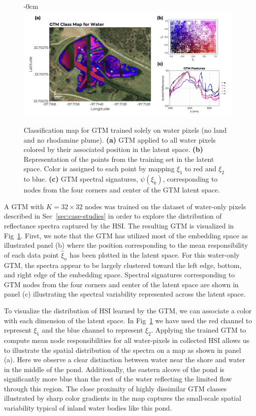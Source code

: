 \documentclass[remotesensing,article,submit,pdftex,moreauthors]{Definitions/mdpi}
\begin{document}
\begin{figure}[t]
\begin{adjustwidth}{-\extralength}{0cm}
\centering
\includegraphics[width=18.0cm]{paper/figures/results/gtm-water.png}
\end{adjustwidth}
\caption{Classification map for GTM trained solely on water pixels (no land and no rhodamine plume). \textbf{(a)} GTM applied to all water pixels colored by their associated position in the latent space. \textbf{(b)} Representation of the points from the training set in the latent space. Color is assigned to each point by mapping $\xi_1$ to red and $\xi_2$ to blue. \textbf{(c)} GTM spectral signatures, $\psi(\xi_k)$, corresponding to nodes from the four corners and center of the GTM latent space. \label{fig:gtm-water}}
\end{figure}  

A GTM with $K=32\times 32$ nodes was trained on the dataset of water-only pixels described in Sec~\ref{sec:case-studies} in order to explore the distribution of reflectance spectra captured by the HSI. The resulting GTM is visualized in Fig~\ref{fig:gtm-water}. First, we note that the GTM has utilized most of the embedding space as illustrated panel (b) where the position corresponding to the mean responsibility of each data point $\hat{\xi}_n$ has been plotted in the latent space. For this water-only GTM, the spectra appear to be largely clustered toward the left edge, bottom, and right edge of the embedding space. Spectral signatures corresponding to GTM nodes from the four corners and center of the latent space are shown in panel (c) illustrating the spectral variability represented across the latent space. 

To visualize the distribution of HSI learned by the GTM, we can associate a color with each dimension of the latent space. In Fig~\ref{fig:gtm-water} we have used the red channel to represent $\xi_1$ and the blue channel to represent $\xi_2$. Applying the trained GTM to compute mean node responsibilities for all water-pixels in collected HSI allows us to illustrate the spatial distribution of the spectra on a map as shown in panel (a). Here we observe a clear distinction between water near the shore and water in the middle of the pond. Additionally, the eastern alcove of the pond is significantly more blue than the rest of the water reflecting the limited flow through this region. The close proximity of highly dissimilar GTM classes illustrated by sharp color gradients in the map captures the small-scale spatial variability typical of inland water bodies like this pond.
\end{document}

